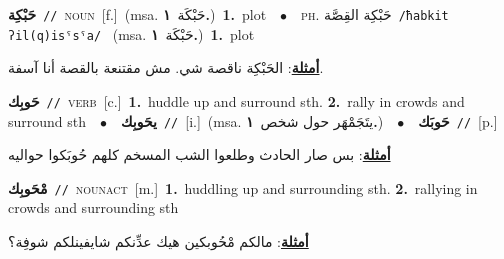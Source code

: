 \documentclass[10pt,a4paper,twoside]{article} %
\begin{document}
\begin{multicols}{2}
{{{{{{{\setlength\topsep{0pt}\textbf{\foreignlanguage{arabic}{حَبْكِة}}\ {\color{gray}\texttt{//}\color{black}}\ \textsc{noun}\ [f.]\ \color{gray}(msa. \foreignlanguage{arabic}{حَبْكَة}~\foreignlanguage{arabic}{\textbf{١.}})\color{black}\ \textbf{1.}~plot\ \ $\bullet$\ \ \textsc{ph.} \color{gray} \foreignlanguage{arabic}{حَبْكِة القِصَّة}\color{black}\ {\color{gray}\texttt{/{\sffamily ħabkit ʔil(q)isˤsˤa}/}\color{black}}\ \color{gray} (msa. \foreignlanguage{arabic}{حَبْكَة}~\foreignlanguage{arabic}{\textbf{١.}})\color{black}\ \textbf{1.}~plot\  \begin{flushright}\color{gray}\foreignlanguage{arabic}{\textbf{\underline{\foreignlanguage{arabic}{أمثلة}}}: الحَبْكِة ناقصة شي. مش مقتنعة بالقصة أنا آسفة.}\end{flushright}\color{black}} \vspace{2mm}

{\setlength\topsep{0pt}\textbf{\foreignlanguage{arabic}{حَوبِك}}\ {\color{gray}\texttt{//}\color{black}}\ \textsc{verb}\ [c.]\ \textbf{1.}~huddle up and surround sth.  \textbf{2.}~rally in crowds and surround sth\ \ $\bullet$\ \ \setlength\topsep{0pt}\textbf{\foreignlanguage{arabic}{يحَوبِك}}\ {\color{gray}\texttt{//}\color{black}}\ [i.]\ \color{gray}(msa. \foreignlanguage{arabic}{يتَجَمْهَر حول شخص}~\foreignlanguage{arabic}{\textbf{١.}})\color{black}\ \ $\bullet$\ \ \setlength\topsep{0pt}\textbf{\foreignlanguage{arabic}{حَوبَك}}\ {\color{gray}\texttt{//}\color{black}}\ [p.]\  \begin{flushright}\color{gray}\foreignlanguage{arabic}{\textbf{\underline{\foreignlanguage{arabic}{أمثلة}}}: بس صار الحادث وطلعوا الشب المسخم كلهم حُوبَكوا حواليه}\end{flushright}\color{black}} \vspace{2mm}

{\setlength\topsep{0pt}\textbf{\foreignlanguage{arabic}{مْحَوبِك}}\ {\color{gray}\texttt{//}\color{black}}\ \textsc{noun\textunderscore act}\ [m.]\ \textbf{1.}~huddling up and surrounding sth.  \textbf{2.}~rallying in crowds and surrounding sth\  \begin{flushright}\color{gray}\foreignlanguage{arabic}{\textbf{\underline{\foreignlanguage{arabic}{أمثلة}}}: مالكم مْحُوبكين هيك عدِّنكم شايفينلكم شوفِة؟}\end{flushright}\color{black}} \vspace{2mm}

}}}}}}
\end{multicols}
\end{document}
